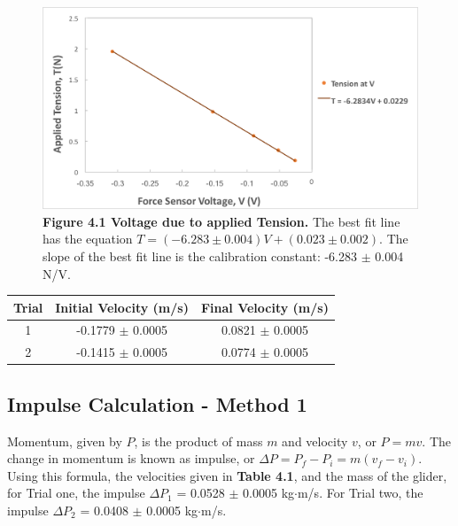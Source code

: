 \documentclass[11pt]{report}
\begin{document}
\begin{figure}[h!]
    \includegraphics[width=\linewidth]{TensionVoltage.png}
    \captionsetup{labelformat=empty}
    \caption{\textbf{Figure 4.1  Voltage due to applied Tension.} The best fit
    line has the equation \(T = (-6.283 \pm 0.004)V + (0.023 \pm 0.002)\).  The
slope of the best fit line is the calibration constant: -6.283 $\pm$ 0.004 N/V.}
\end{figure}

\begin{center}
    \begin{tabular}{| c | c | c |}
        \hline
        Trial & Initial Velocity (m/s) & Final Velocity (m/s) \\
        \hline
        1 & -0.1779 $\pm$ 0.0005 & 0.0821 $\pm$ 0.0005 \\
        \hline
        2 & -0.1415 $\pm$ 0.0005 & 0.0774 $\pm$ 0.0005 \\
        \hline
    \end{tabular}
\end{center}

\subsection*{Impulse Calculation - Method 1}
Momentum, given by \(P\), is the product of mass \(m\) and velocity \(v\), or
\(P = mv\).  The change in momentum is known as impulse, or \(\Delta P = P_f -
P_i = m(v_f - v_i)\).  Using this formula, the velocities given in \textbf{Table
4.1}, and the mass of the glider, for Trial
one, the impulse $\Delta P_1$ = 0.0528 $\pm$ 0.0005 kg$\cdot$m/s.  For Trial
two, the impulse $\Delta P_2$ = 0.0408 $\pm$ 0.0005 kg$\cdot$m/s.
\end{document}
